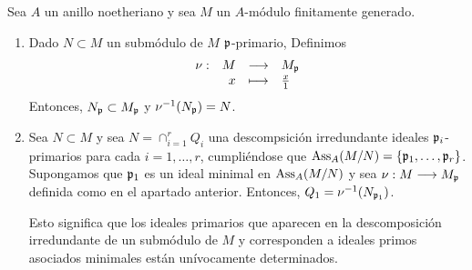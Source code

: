 \documentclass[../main.tex]{subfiles}
\begin{document}
\begin{theorem}
	Sea $A$ un anillo noetheriano y sea $M$ un $A$-módulo finitamente generado.\begin{enumerate}
		\item Dado $N\subset M$ un submódulo de $M$ $\mathfrak{p}$-primario, Definimos 
		$$\begin{array}{rrcl}
		\nu:&M&\longrightarrow&M_{\mathfrak{p}}\\
		&x&\longmapsto&\frac{x}{1}\\ \end{array}$$ Entonces, $N_{\mathfrak{p}}\subset M_{\mathfrak{p}}$ y $\nu^{-1}(N_{\mathfrak{p}})=N$.
		\item Sea $N\subset M$ y sea $N=\cap_{i=1}^rQ_i$ una descompsición irredundante ideales $\mathfrak{p}_i$-primarios para cada $i=1,\dots,r$, cumpliéndose que $\text{Ass}_A(M/N)=\{\mathfrak{p}_1,\dots,\mathfrak{p}_r\}$. Supongamos que $\mathfrak{p}_1$ es un ideal minimal en $\text{Ass}_A(M/N)$ y sea $\nu:M\longrightarrow M_{\mathfrak{p}}$ definida como en el apartado anterior. Entonces, $Q_1=\nu^{-1}(N_{\mathfrak{p}_1})$.
		
		Esto significa que los ideales primarios que aparecen en la descomposición irredundante de un submódulo de $M$ y corresponden a ideales primos asociados minimales están unívocamente determinados.
	\end{enumerate}
\end{theorem}
\end{document}

